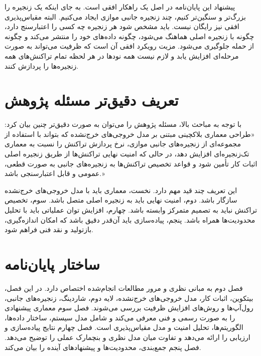 پیشنهاد این پایان‌نامه در اصل یک راهکار افقی است. به جای اینکه یک زنجیره را بزرگ‌تر و سنگین‌تر کنیم، چند زنجیره جانبی موازی ایجاد می‌کنیم. البته مقیاس‌پذیری افقی نیز رایگان نیست. باید مشخص شود هر زنجیره چه کسی را اعتبارسنج دارد، چگونه با زنجیره اصلی هماهنگ می‌شود، چگونه داده‌های خود را منتشر می‌کند و چگونه از حمله جلوگیری می‌شود. مزیت رویکرد افقی آن است که ظرفیت می‌تواند به صورت مرحله‌ای افزایش یابد و لازم نیست همه نودها در هر لحظه تمام تراکنش‌های همه زنجیره‌ها را پردازش کنند.

\section{تعریف دقیق‌تر مسئله پژوهش}

با توجه به مباحث بالا، مسئله پژوهش را می‌توان به صورت دقیق‌تر چنین بیان کرد: «طراحی معماری بلاکچینی مبتنی بر مدل خروجی‌های خرج‌نشده که بتواند با استفاده از مجموعه‌ای از زنجیره‌های جانبی موازی، نرخ پردازش تراکنش را نسبت به معماری تک‌زنجیره‌ای افزایش دهد، در حالی که امنیت نهایی تراکنش‌ها از طریق زنجیره اصلی اثبات کار تأمین شود و قواعد تخصیص تراکنش‌ها به زنجیره‌های جانبی به صورت قطعی، عمومی و قابل اعتبارسنجی باشد.»

این تعریف چند قید مهم دارد. نخست، معماری باید با مدل خروجی‌های خرج‌نشده سازگار باشد. دوم، امنیت نهایی باید به زنجیره اصلی متصل باشد. سوم، تخصیص تراکنش نباید به تصمیم متمرکز وابسته باشد. چهارم، افزایش توان عملیاتی باید با تحلیل محدودیت‌ها همراه باشد. پنجم، پیاده‌سازی باید آن‌قدر دقیق باشد که امکان اندازه‌گیری، بازتولید و نقد فنی فراهم شود.

\section{ساختار پایان‌نامه}

فصل دوم به مبانی نظری و مرور مطالعات انجام‌شده اختصاص دارد. در این فصل، بیتکوین، اثبات کار، مدل خروجی‌های خرج‌نشده، لایه دوم، شاردینگ، زنجیره‌های جانبی، رول‌آپ‌ها و روش‌های افزایش ظرفیت بررسی می‌شوند. فصل سوم معماری پیشنهادی را به صورت رسمی و فنی معرفی می‌کند و شامل مدل سیستم، ساختار داده‌ها، الگوریتم‌ها، تحلیل امنیت و مدل مقیاس‌پذیری است. فصل چهارم نتایج پیاده‌سازی و ارزیابی را ارائه می‌دهد و تفاوت میان مدل نظری و بنچمارک عملی را توضیح می‌دهد. فصل پنجم جمع‌بندی، محدودیت‌ها و پیشنهادهای آینده را بیان می‌کند.

